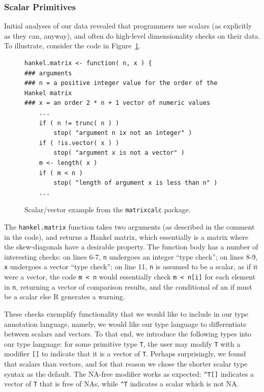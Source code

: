 \documentclass[acmsmall,review,anonymous]{acmart}\settopmatter{printfolios=true,printccs=false,printacmref=false}
\newcommand{\code}[1]{{\lstinline[style=Rin]!#1!}\xspace}
\begin{document}
%
%
\subsubsection{Scalar Primitives}

Initial analyses of our data revealed that programmers  use
scalars (as explicitly as they can, anyway), and often do high-level
dimensionality checks on their data.  To illustrate, consider the code in
Figure~\ref{fig:scalar-vector-example}.

\begin{figure}[htbp]
\begin{center}

\begin{lstlisting}
hankel.matrix <- function( n, x ) { 
### arguments
### n = a positive integer value for the order of the Hankel matrix
### x = an order 2 * n + 1 vector of numeric values
    ...
    if ( n != trunc( n ) )
        stop( "argument n ix not an integer" )
    if ( !is.vector( x ) )
        stop( "argument x is not a vector" )
    m <- length( x )
    if ( m < n )
        stop( "length of argument x is less than n" )
    ...
\end{lstlisting}

\caption{Scalar/vector example from the \code{matrixcalc} package.}
\label{fig:scalar-vector-example}
\end{center}
\end{figure}

The \code{hankel.matrix} function takes two arguments (as described in the
comment in the code), and returns a Hankel matrix, which essentially is a
matrix where the skew-diagonals have a desirable property.  The function
body has a number of interesting checks: on lines 6-7, \code{n} undergoes an
integer ``type check''; on lines 8-9, \code{x} undergoes a vector ``type
check''; on line 11, \code{n} is assumed to be a scalar, as if it were a
vector, the code \code{m < n} would essentially check \code{m < n[i]} for
each element in \code{n}, returning a vector of comparison results, and the
conditional of an if must be a scalar else R generates a warning.

These checks exemplify functionality that we would like to include in our
type annotation language, namely, we would like our type language to
differentiate between scalars and vectors.  To that end, we introduce the
following types into our type language: for some primitive type \code{T},
the user may modify \code{T} with a modifier \code{[]} to indicate that it
is a vector of \code{T}.  Perhaps surprisingly, we found that scalars
 than vectors, and for that reason we chose the
shorter scalar type syntax as the default.  The NA-free modifier works as
expected: \code{^T[]} indicates a vector of \code{T} that is free of NAs,
while \code{^T} indicates a scalar which is not NA.
 
\end{document}
